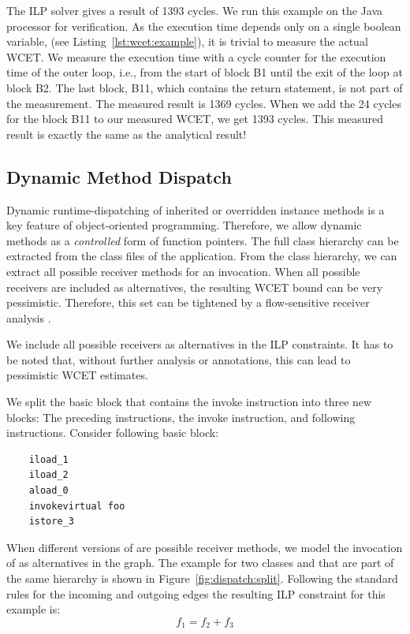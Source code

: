 The ILP solver  gives a result of 1393 cycles. We run
this example on the Java processor for verification. As the execution
time depends only on a single boolean variable,  (see
Listing~\ref{lst:wcet:example}), it is trivial to measure the actual
WCET. We measure the execution time with a cycle counter for the
execution time of the outer loop, i.e., from the start of block B1
until the exit of the loop at block B2. The last block, B11, which
contains the return statement, is not part of the measurement. The
measured result is 1369 cycles.  When we add the 24 cycles for the
block B11 to our measured WCET, we get 1393 cycles. This measured
result is exactly the same as the analytical result!

\subsection{Dynamic Method Dispatch}

Dynamic runtime-dispatching of inherited or overridden instance
methods is a key feature of object-oriented programming. Therefore,
we allow dynamic methods as a \emph{controlled} form of function
pointers. The full class hierarchy can be extracted from the class
files of the application. From the class hierarchy, we can extract
all possible receiver methods for an invocation. When all possible
receivers are included as alternatives, the resulting WCET bound can
be very pessimistic. Therefore, this set can be tightened by a
flow-sensitive receiver analysis \cite{dfa:puffitsch:2009}.

We include all possible receivers as alternatives in the ILP
constraints. It has to be noted that, without further analysis or
annotations, this can lead to pessimistic WCET estimates.

We split the basic block that contains the invoke instruction into
three new blocks: The preceding instructions, the invoke instruction,
and following instructions. Consider following basic block:

\begin{samepage}
\begin{verbatim}
    iload_1
    iload_2
    aload_0
    invokevirtual foo
    istore_3
\end{verbatim}
\end{samepage}

When different versions of  are possible receiver
methods, we model the invocation of  as alternatives in
the graph. The example for two classes  and  that are
part of the same hierarchy is shown in
Figure~\ref{fig:dispatch:split}. Following the standard rules for the
incoming and outgoing edges the resulting ILP constraint for this
example is:
\begin{equation*}
    f_1 = f_2 + f_3
\end{equation*}


